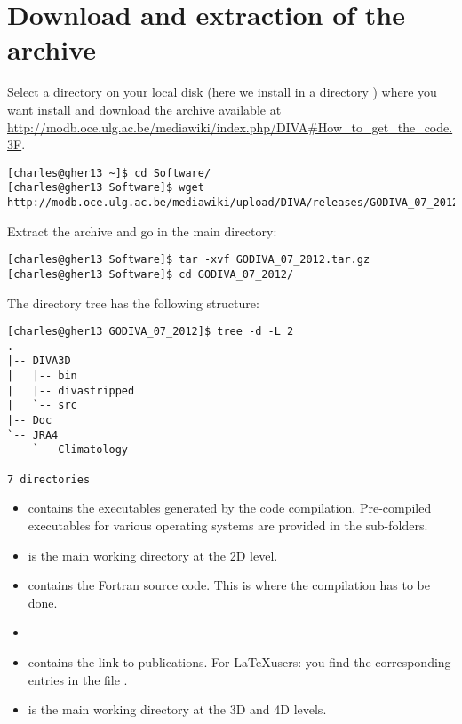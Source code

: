 \section{Download and extraction of the archive}

Select a directory on your local disk (here we install in a directory ) where you want install \diva and download the archive available at \url{http://modb.oce.ulg.ac.be/mediawiki/index.php/DIVA#How_to_get_the_code.3F}.

\begin{lstlisting}[style=Bash]
[charles@gher13 ~]$ cd Software/
[charles@gher13 Software]$ wget http://modb.oce.ulg.ac.be/mediawiki/upload/DIVA/releases/GODIVA_07_2012.tar.gz
\end{lstlisting}

Extract the archive and go in the main directory:
\begin{lstlisting}[style=Bash]
[charles@gher13 Software]$ tar -xvf GODIVA_07_2012.tar.gz
[charles@gher13 Software]$ cd GODIVA_07_2012/
\end{lstlisting}

The directory tree has the following structure: %
\begin{lstlisting}[style=Bash]
[charles@gher13 GODIVA_07_2012]$ tree -d -L 2
.
|-- DIVA3D
|   |-- bin
|   |-- divastripped
|   `-- src
|-- Doc
`-- JRA4
    `-- Climatology

7 directories
\end{lstlisting}


\begin{itemize}
\item {} contains the executables generated by the code compilation. Pre-compiled executables for various operating systems are provided in the sub-folders.
\item {} is the main working directory at the 2D level. 
\item {} contains the Fortran source code. This is where the compilation has to be done.
\item[]
\item {} contains the link to publications. For \LaTeX users: you find the corresponding \BibTeX  entries in the file .
\item {} is the main working directory at the 3D and 4D levels.
\end{itemize}

